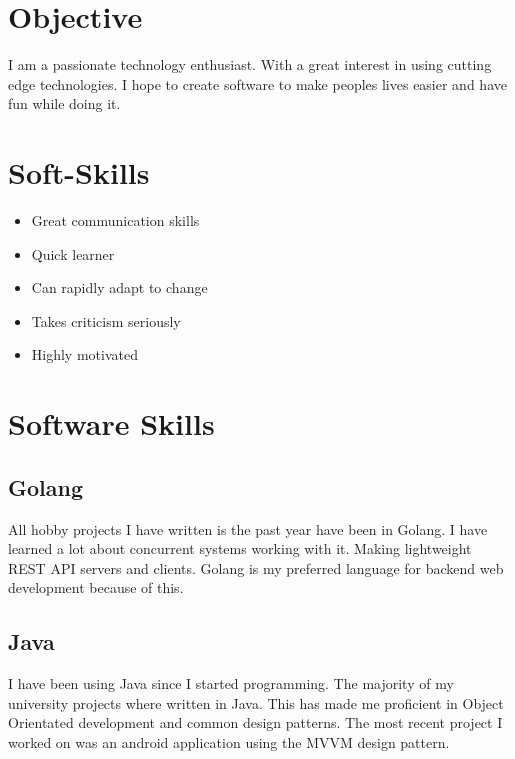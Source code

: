 \documentclass[a4paper]{cv}
\begin{document}
\section{Objective}
\begin{flushleft}
I am a passionate technology enthusiast. With a great interest in using cutting edge technologies.
I hope to create software to make peoples lives easier and have fun while doing it.
\end{flushleft}
\begin{minipage}[t]{0.33\textwidth}
\section{Soft-Skills}
\begin{itemize}
\item Great communication skills
\item Quick learner
\item Can rapidly adapt to change
\item Takes criticism seriously
\item Highly motivated
\end{itemize}

\section{Software Skills}
\subsection{Golang}
\begin{flushleft}
All hobby projects I have written is the past year have been in Golang. I have learned a lot about concurrent systems working with it. Making lightweight REST API servers and clients. Golang is my preferred language for backend web development because of this.
\end{flushleft}
\sectionspace

\subsection{Java}
\begin{flushleft}
I have been using Java since I started programming. The majority of my university projects where written in Java. This has made me proficient in Object Orientated development and common design patterns. The most recent project I worked on was an android application using the MVVM design pattern.
\end{flushleft}


\end{minipage}
\end{document}

